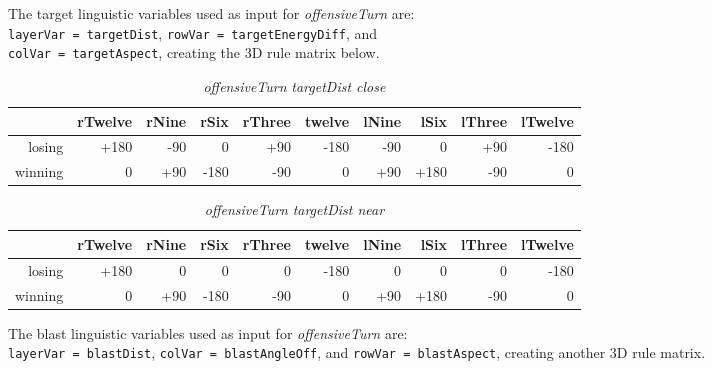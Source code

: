 The target linguistic variables used as input for \emph{offensiveTurn} are: \\ \texttt{layerVar = targetDist}, \texttt{rowVar = targetEnergyDiff}, and \\ \texttt{colVar = targetAspect}, creating the 3D rule matrix below.
\begin{table}[H]
\centering
\caption{\emph{offensiveTurn} \emph{targetDist close}}
\begin{tabular}{r|r|r|r|r|r|r|r|r|r}
 		& rTwelve 	& rNine 	& rSix 		& rThree 		& twelve 	& lNine 	& lSix 		& lThree	& lTwelve		\\ \hline
losing	& +180		& -90		& 0			& +90 		 	& -180		& -90		& 0 		& +90		& -180			\\
winning	& 0			& +90		& -180		& -90			& 0			& +90		& +180		& -90		& 0			
\end{tabular}
\end{table}

\begin{table}[H]
\centering
\caption{\emph{offensiveTurn} \emph{targetDist near}}
\begin{tabular}{r|r|r|r|r|r|r|r|r|r}
 		& rTwelve 	& rNine 	& rSix 		& rThree 		& twelve 	& lNine 	& lSix 		& lThree	& lTwelve		\\ \hline
losing	& +180		& 0			& 0			& 0 		 	& -180		& 0			& 0 		& 0			& -180			\\
winning	& 0			& +90		& -180		& -90			& 0			& +90		& +180		& -90		& 0			
\end{tabular}
\end{table}

The blast linguistic variables used as input for \emph{offensiveTurn} are: \\ \texttt{layerVar = blastDist}, \texttt{colVar = blastAngleOff}, and \texttt{rowVar = blastAspect}, creating another 3D rule matrix.

